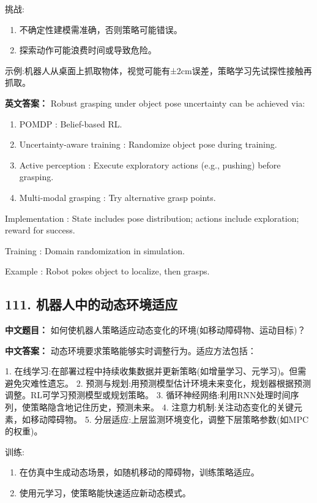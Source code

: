 \documentclass[10pt,a4paper]{ctexart}
\begin{document}
 挑战:
\begin{enumerate}
    \item 不确定性建模需准确，否则策略可能错误。
    \item 探索动作可能浪费时间或导致危险。
\end{enumerate}

 示例:机器人从桌面上抓取物体，视觉可能有±2cm误差，策略学习先试探性接触再抓取。

\textbf{英文答案：}  
Robust grasping under object pose uncertainty can be achieved via:
\begin{enumerate}
    \item POMDP : Belief-based RL.
    \item Uncertainty-aware training : Randomize object pose during training.
    \item Active perception : Execute exploratory actions (e.g., pushing) before grasping.
    \item Multi-modal grasping : Try alternative grasp points.
\end{enumerate}

 Implementation : State includes pose distribution; actions include exploration; reward for success.

 Training : Domain randomization in simulation.

 Example : Robot pokes object to localize, then grasps.

\subsection*{111. 机器人中的动态环境适应}
\textbf{中文题目：} 如何使机器人策略适应动态变化的环境(如移动障碍物、运动目标)？

\textbf{中文答案：}  
动态环境要求策略能够实时调整行为。适应方法包括：

1.  在线学习:在部署过程中持续收集数据并更新策略(如增量学习、元学习)。但需避免灾难性遗忘。
2.  预测与规划:用预测模型估计环境未来变化，规划器根据预测调整。RL可学习预测模型或规划策略。
3.  循环神经网络:利用RNN处理时间序列，使策略隐含地记住历史，预测未来。
4.  注意力机制:关注动态变化的关键元素，如移动障碍物。
5.  分层适应:上层监测环境变化，调整下层策略参数(如MPC的权重)。

 训练:
\begin{enumerate}
    \item 在仿真中生成动态场景，如随机移动的障碍物，训练策略适应。
    \item 使用元学习，使策略能快速适应新动态模式。
\end{enumerate}
\end{document}
